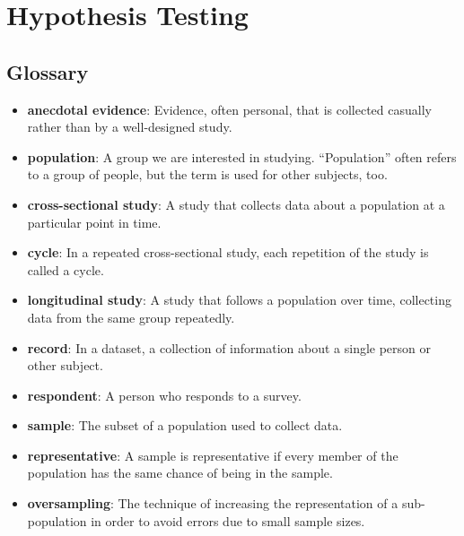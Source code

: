  \chapter{Hypothesis Testing}  \section*{Glossary} \begin{itemize}
	
	\item {\bf anecdotal evidence}: Evidence, often personal, that is collected
	casually rather than by a well-designed study.
	
	\item {\bf population}: A group we are interested in studying.
	``Population'' often refers to a
	group of people, but the term is used for other subjects,
	too.
	
	\item {\bf cross-sectional study}: A study that collects data about a
	population at a particular point in time.
	
	\item {\bf cycle}: In a repeated cross-sectional study, each repetition
	of the study is called a cycle.
	
	\item {\bf longitudinal study}: A study that follows a population over
	time, collecting data from the same group repeatedly.
	
	\item {\bf record}: In a dataset, a collection of information about
	a single person or other subject.
	
	\item {\bf respondent}: A person who responds to a survey.
	
	\item {\bf sample}: The subset of a population used to collect data.
	
	\item {\bf representative}: A sample is representative if every member
	of the population has the same chance of being in the sample.
	
	\item {\bf oversampling}: The technique of increasing the representation
	of a sub-population in order to avoid errors due to small sample
	sizes.
	

\end{itemize}
